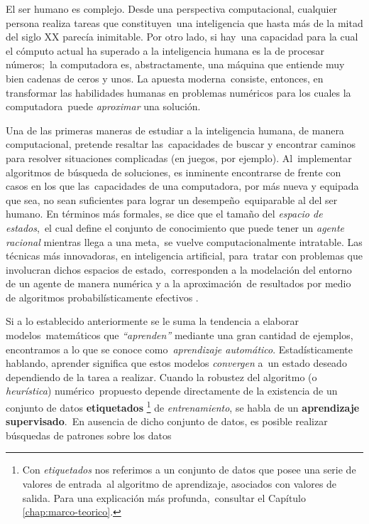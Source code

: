 \noindent
El ser humano es complejo. Desde una perspectiva computacional, cualquier persona realiza tareas que constituyen\
una inteligencia que hasta más de la mitad del siglo XX parecía inimitable. Por otro lado, si hay\
una capacidad para la cual el cómputo actual ha superado a la inteligencia humana es la de procesar números;\
la computadora es, abstractamente, una máquina que entiende muy bien cadenas de ceros y unos. La apuesta moderna\
consiste, entonces, en transformar las habilidades humanas en problemas numéricos para los cuales la computadora\
puede \emph{aproximar} una solución.\par
Una de las primeras maneras de estudiar a la inteligencia humana, de manera computacional, pretende resaltar las\
capacidades de buscar y encontrar caminos para resolver situaciones complicadas (en juegos, por ejemplo). Al\
implementar algoritmos de búsqueda de soluciones, es inminente encontrarse de frente con casos en los que las\
capacidades de una computadora, por más nueva y equipada que sea, no sean suficientes para lograr un desempeño\
equiparable al del ser humano. En términos más formales, se dice que el tamaño del \emph{espacio de estados},\
el cual define el conjunto de conocimiento que puede tener un \emph{agente racional} mientras llega a una meta,\
se vuelve computacionalmente intratable. Las técnicas más innovadoras, en inteligencia artificial, para\
tratar con problemas que involucran dichos espacios de estado,\
corresponden a la modelación del entorno de un agente de manera numérica y a la aproximación\
de resultados por medio de algoritmos probabilísticamente efectivos \cite{russell2010}.\par
Si a lo establecido anteriormente se le suma la tendencia a elaborar modelos\
matemáticos que \emph{``aprenden''} mediante una gran cantidad de ejemplos, encontramos a lo que se conoce como\
\emph{aprendizaje automático}. Estadísticamente hablando, aprender significa que estos modelos \emph{convergen} a\
un estado deseado dependiendo de la tarea a realizar. Cuando la robustez del algoritmo (o \emph{heurística}) numérico\
propuesto depende directamente de la existencia de un conjunto de datos \textbf{etiquetados}%
\footnote{
  Con \emph{etiquetados} nos referimos a un conjunto de datos que posee una serie de valores de entrada\
  al algoritmo de aprendizaje, asociados con valores de salida. Para una explicación más profunda,\
  consultar el Capítulo \ref{chap:marco-teorico}.
} de \emph{entrenamiento}, se habla de un \textbf{aprendizaje supervisado}.\
En ausencia de dicho conjunto de datos, es posible realizar búsquedas de patrones sobre los datos\
